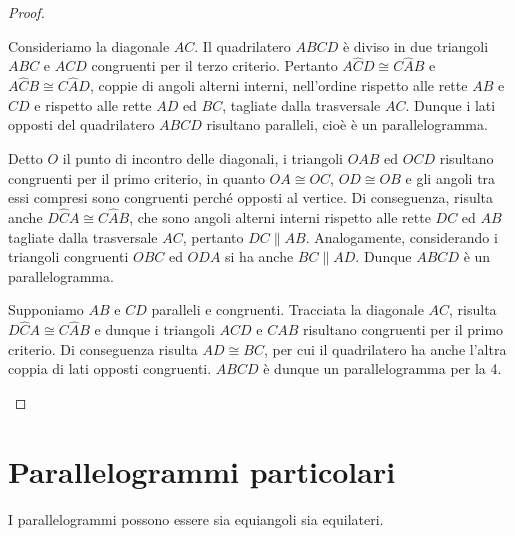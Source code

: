 \begin{proof}
\begin{enumerate*}
\item Consideriamo la diagonale $AC$. Il quadrilatero $ABCD$ è diviso in due triangoli $ABC$ e $ACD$ congruenti per il terzo criterio. Pertanto $A\widehat{C}D\cong C\widehat{A}B$ e $A\widehat{C}B\cong C\widehat{A}D$, coppie di angoli alterni interni, nell'ordine rispetto alle rette $AB$ e $CD$ e rispetto alle rette $AD$ ed $BC$, tagliate dalla trasversale $AC$. Dunque i lati opposti del quadrilatero $ABCD$ risultano paralleli, cioè è un parallelogramma.
\item Detto $O$ il punto di incontro delle diagonali, i triangoli $OAB$ ed $OCD$ risultano congruenti per il primo criterio, in quanto $OA\cong OC$, $OD\cong OB$ e gli angoli tra essi compresi sono congruenti perché opposti al vertice. Di conseguenza, risulta anche $D\widehat{C}A\cong C\widehat{A}B$, che sono angoli alterni interni rispetto alle rette $DC$ ed $AB$ tagliate dalla trasversale $AC$, pertanto $DC\parallel AB$. Analogamente, considerando i triangoli congruenti $OBC$ ed $ODA$ si ha anche $BC\parallel AD$. Dunque $ABCD$ è un parallelogramma.
\item Supponiamo $AB$ e $CD$ paralleli e congruenti. Tracciata la diagonale $AC$, risulta $D\widehat{C}A\cong C\widehat{A}B$ e dunque i triangoli $ACD$ e $CAB$ risultano congruenti per il primo criterio. Di conseguenza risulta $AD\cong BC$, per cui il quadrilatero ha anche l'altra coppia di lati opposti congruenti. $ABCD$ è dunque un parallelogramma per la 4.
\end{enumerate*}
\end{proof}

\section{Parallelogrammi particolari}\label{sect:parallelogrammi_particolari}

I parallelogrammi possono essere sia equiangoli sia equilateri.

